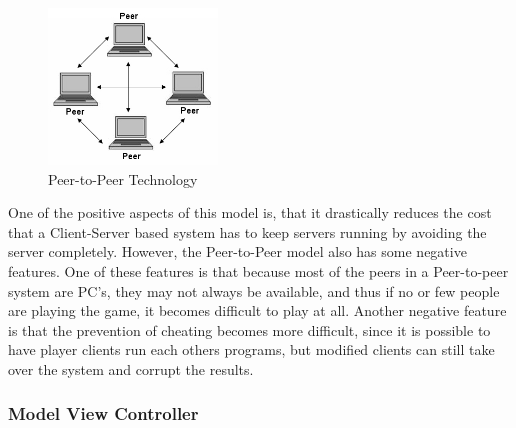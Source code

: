 \begin{figure}[h]
  \centering
    \includegraphics[width=0.4\textwidth]{img/p2p.jpg}
  \caption{Peer-to-Peer Technology \citep{PeerToPeer}}
  \label{fig:p2p}
\end{figure}

One of the positive aspects of this model is, that it drastically reduces the cost that a Client-Server based system has to keep servers running by avoiding the server completely. However, the Peer-to-Peer model also has some negative features. One of these features is that because most of the peers in a Peer-to-peer system are PC's, they may not always be available, and thus if no or few people are playing the game, it becomes difficult to play at all. Another negative feature is that the prevention of cheating becomes more difficult, since it is possible to have player clients run each others programs, but modified clients can still take over the system and corrupt the results.\newline

\subsubsection{Model View Controller}
